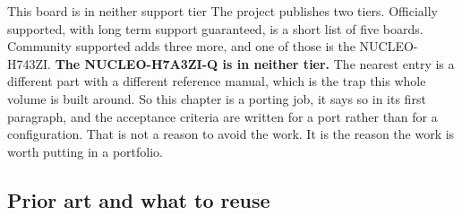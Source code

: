 \begin{note}{This board is in neither support tier}
The project publishes two tiers. Officially supported, with long term support
guaranteed, is a short list of five boards. Community supported adds three more,
and one of those is the NUCLEO-H743ZI. \textbf{The NUCLEO-H7A3ZI-Q is in neither
tier.} The nearest entry is a different part with a different reference manual,
which is the trap this whole volume is built around. So this chapter is a
porting job, it says so in its first paragraph, and the acceptance criteria are
written for a port rather than for a configuration. That is not a reason to
avoid the work. It is the reason the work is worth putting in a portfolio.
\end{note}

\subsection*{Prior art and what to reuse}

